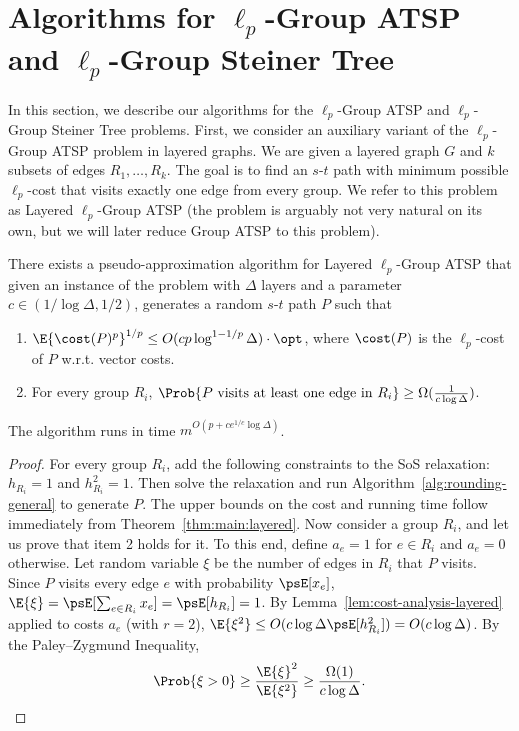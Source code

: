 \documentclass[11pt,a4paper]{article}
\begin{document}
\section{Algorithms for \texorpdfstring{$\ell_p$}{l-p}-Group ATSP and \texorpdfstring{$\ell_p$}{l-p}-Group Steiner Tree}\label{sec:ATSP-and-Steiner-Tree}
In this section, we describe our algorithms for the \(\ell_p\)-Group ATSP and \(\ell_p\)-Group Steiner Tree problems.
First, we consider an auxiliary variant of the $\ell_p$-Group ATSP problem in layered graphs. We are given a layered graph $G$ and $k$ subsets of edges $R_1,\dots, R_k$. The goal is to find an $s$-$t$ path with minimum possible $\ell_p$-cost that visits  exactly one edge from every group. We  refer to this problem as Layered $\ell_p$-Group ATSP (the problem is arguably not very natural on its own, but we will later reduce Group ATSP to this problem).

\begin{theorem}\label{thm:ATSP:main}
There exists a pseudo-approximation algorithm for Layered $\ell_p$-Group ATSP that given an instance of the problem with $\Delta$ layers and a parameter $c \in (1/\log \Delta, 1/2)$, generates a random $s$-$t$ path $P$ such that
\begin{enumerate}
    \item $\E{\cost(P)^p}^{1/p} \leq O(c p\log^{1-1/p} \Delta) \cdot \opt$, where $\cost(P)$ is the $\ell_p$-cost of $P$ w.r.t. vector costs.
    \item For every group $R_i$, $\Prob{P \text{ visits at least one edge in } R_i} \geq \Omega(\frac{1}{c\log \Delta})$.
\end{enumerate}
The algorithm runs in time $m^{O(p + c e^{1/c} \log \Delta)}$.
\end{theorem}
\begin{proof}
For every group $R_i$, add the following constraints to the SoS relaxation: $h_{R_i} = 1$ and $h_{R_i}^2 = 1$. Then solve the relaxation and run Algorithm~\ref{alg:rounding-general} to generate $P$. The upper bounds on the cost and running time follow immediately from Theorem~\ref{thm:main:layered}. Now consider a group $R_i$, and let us prove that item 2 holds for it. To this end, define $a_e = 1$ for $e\in R_i$ and $a_e = 0$ otherwise. Let random variable $\xi$ be the number of edges in $R_i$ that $P$ visits. Since $P$ visits every edge $e$ with probability $\psE[x_e]$, $\E{\xi} = \psE[\sum_{e\in R_i} x_e] = \psE[h_{R_i}] =1$. By Lemma~\ref{lem:cost-analysis-layered} applied to costs $a_e$ (with $r=2$), $\E{\xi^2} \leq O(c\log \Delta \psE[h_{R_i}^2]) = O(c \log \Delta)$. By the Paley--Zygmund Inequality,
$$\Prob{\xi>0} \geq \frac{\E{\xi}^2}{\E{\xi^2}} \geq \frac{\Omega(1)}{c\log \Delta}.$$
\end{proof}
\end{document}
